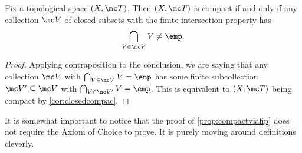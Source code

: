\documentclass[../notes.tex]{subfiles}
\begin{document}
\begin{proposition} \label{prop:compactviafip}
	Fix a topological space $(X,\mc T)$. Then $(X,\mc T)$ is compact if and only if any collection $\mc V$ of closed subsets with the finite intersection property has
	\[\bigcap_{V\in\mc V}V\ne\emp.\]
\end{proposition}
\begin{proof}
	Applying contraposition to the conclusion, we are saying that any collection $\mc V$ with $\bigcap_{V\in\mc V}V=\emp$ has some finite subcollection $\mc V'\subseteq\mc V$ with $\bigcap_{V\in\mc V'}V=\emp$. This is equivalent to $(X,\mc T)$ being compact by \autoref{cor:closedcompac}.
\end{proof}
\begin{remark}
	It is somewhat important to notice that the proof of \autoref{prop:compactviafip} does not require the Axiom of Choice to prove. It is purely moving around definitions cleverly.
\end{remark}
\end{document}
